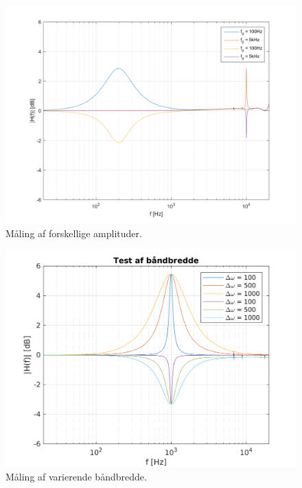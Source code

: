 

\begin{figure}[h!]
\centering
\includegraphics[scale = 0.8]{matlabdemo/test/test_freq_peak.png}
\caption{Måling af forskellige amplituder.}
\label{fig:eq_freq_peak}
\end{figure}





\begin{figure}[h!]
\centering
\includegraphics[scale = 0.8]{matlabdemo/test/test_bw.png}
\caption{Måling af varierende båndbredde.}
\label{fig:eq_bw}
\end{figure}




